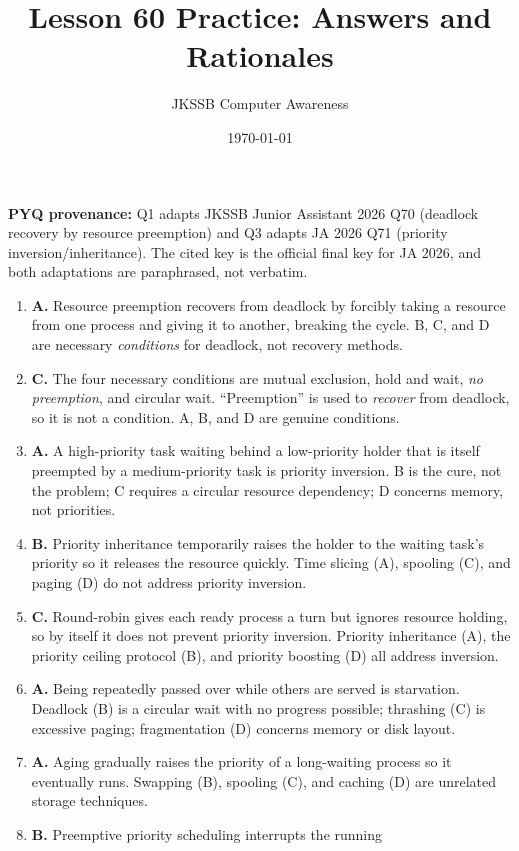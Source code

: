 \documentclass[11pt]{article}
\title{Lesson 60 Practice: Answers and Rationales}
\author{JKSSB Computer Awareness}
\date{\today}
\begin{document}
\maketitle
\noindent\textbf{PYQ provenance:} Q1 adapts JKSSB Junior Assistant 2026 Q70
(deadlock recovery by resource preemption) and Q3 adapts JA 2026 Q71
(priority inversion/inheritance). The cited key is the official final key for
JA 2026, and both adaptations are paraphrased, not verbatim.
\begin{enumerate}[label=\textbf{Q\arabic*.}, leftmargin=*]
\item \textbf{A.} Resource preemption recovers from deadlock by forcibly
  taking a resource from one process and giving it to another, breaking the
  cycle. B, C, and D are necessary \emph{conditions} for deadlock, not
  recovery methods.
\item \textbf{C.} The four necessary conditions are mutual exclusion, hold and
  wait, \emph{no preemption}, and circular wait. ``Preemption'' is used to
  \emph{recover} from deadlock, so it is not a condition. A, B, and D are
  genuine conditions.
\item \textbf{A.} A high-priority task waiting behind a low-priority holder
  that is itself preempted by a medium-priority task is priority inversion. B
  is the cure, not the problem; C requires a circular resource dependency; D
  concerns memory, not priorities.
\item \textbf{B.} Priority inheritance temporarily raises the holder to the
  waiting task's priority so it releases the resource quickly. Time slicing
  (A), spooling (C), and paging (D) do not address priority inversion.
\item \textbf{C.} Round-robin gives each ready process a turn but ignores
  resource holding, so by itself it does not prevent priority inversion.
  Priority inheritance (A), the priority ceiling protocol (B), and priority
  boosting (D) all address inversion.
\item \textbf{A.} Being repeatedly passed over while others are served is
  starvation. Deadlock (B) is a circular wait with no progress possible;
  thrashing (C) is excessive paging; fragmentation (D) concerns memory or
  disk layout.
\item \textbf{A.} Aging gradually raises the priority of a long-waiting
  process so it eventually runs. Swapping (B), spooling (C), and caching (D)
  are unrelated storage techniques.
\item \textbf{B.} Preemptive priority scheduling interrupts the running

\end{enumerate}
\end{document}
